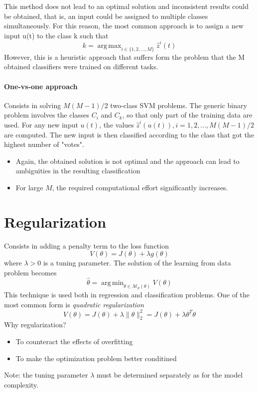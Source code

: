 \documentclass{book}
\DeclareMathOperator*{\argmax}{arg\,max}
\DeclareMathOperator*{\argmin}{arg\,min}
\theoremstyle{definition}
\theoremstyle{remark}
\theoremstyle{remark}
\begin{document}
This method does not lead to an optimal solution and inconsistent results could be obtained, that is, an input could be assigned to multiple classes simultaneously. For this reason, the most common approach is to assign a new input u(t) to the class k such that 
\[
  k=\argmax_{i\in\{1,2,\dots,M\}}\hat{z}^i(t)
\]
However, this is a heuristic approach that suffers form the problem that the M obtained classifiers were trained on different tasks.
\subsubsection{One-vs-one approach}
Consists in solving $M(M - 1)/2$ two-class SVM problems.
The generic binary problem involves the classes $C_i$ and $C_k$, so that only part of the training data are used.
For any new input $u(t)$, the values $\hat{z}^i(u(t)), i = 1,2,...,M(M - 1)/2$ are computed.
The new input is then classified according to the class that got the highest number of "votes".
\begin{itemize}
  \item Again, the obtained solution is not optimal and the approach can lead to ambiguities in the resulting classification
  \item For large $M$, the required computational effort significantly increases.
\end{itemize}

\chapter{Regularization}
Consists in adding a penalty term to the loss function 
\[
  V(\theta)=J(\theta)+\lambda g(\theta)
\]
where $\lambda>0$ is a tuning parameter. The solution of the learning from data problem becomes 
\[
  \hat{\theta}=\argmin_{\theta\in\mathcal{M}_p(\theta)}V(\theta)
\]
This technique is used both in regression and classification problems. One of the most common form is \emph{quadratic regularization}
\[
  V(\theta)=J(\theta)+\lambda\|\theta\|_2^2=J(\theta)+\lambda\theta^T\theta
\]
Why regularization? 
\begin{itemize}
  \item To counteract the effects of overfitting 
  \item To make the optimization problem better conditined
\end{itemize}
Note: the tuning parameter $\lambda$ must be determined separately as for the model complexity.
\end{document}
